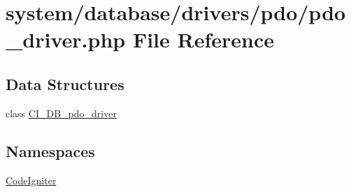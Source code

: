 \hypertarget{pdo__driver_8php}{}\section{system/database/drivers/pdo/pdo\+\_\+driver.php File Reference}
\label{pdo__driver_8php}
\subsection*{Data Structures}
\begin{DoxyCompactItemize}
\item 
class \mbox{\hyperlink{class_c_i___d_b__pdo__driver}{C\+I\+\_\+\+D\+B\+\_\+pdo\+\_\+driver}}
\end{DoxyCompactItemize}
\subsection*{Namespaces}
\begin{DoxyCompactItemize}
\item 
 \mbox{\hyperlink{namespace_code_igniter}{Code\+Igniter}}
\end{DoxyCompactItemize}
